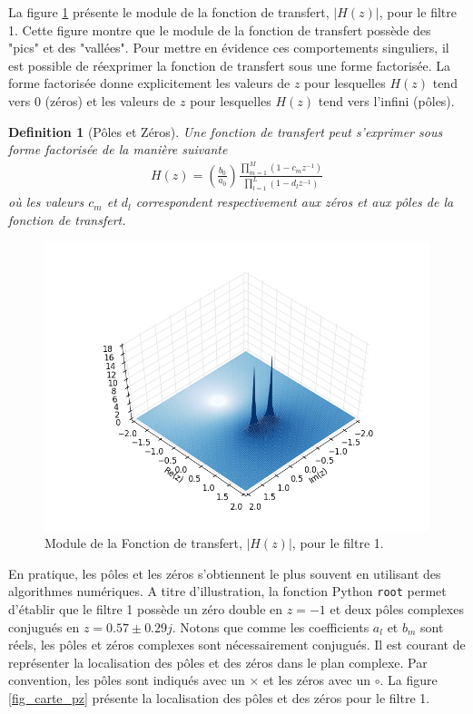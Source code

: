 \documentclass[11pt,a4paper]{IEEEtran}
\newtheorem{definition}{Definition}
\begin{document}
La figure \ref{fig_abs_z} présente le module de la fonction de transfert, $|H(z)|$, pour le filtre 1. Cette figure montre que le module de la fonction de transfert possède des "pics" et des "vallées". Pour mettre en évidence ces comportements singuliers, il est possible de réexprimer la fonction de transfert sous une forme factorisée. La forme factorisée donne explicitement les valeurs de $z$ pour lesquelles $H(z)$ tend vers $0$ (zéros) et les valeurs de $z$ pour lesquelles $H(z)$ tend vers l'infini (pôles). 

\begin{definition}[Pôles et Zéros] Une fonction de transfert peut s'exprimer sous forme factorisée de la manière suivante
\begin{align*}
H(z)=\left(\frac{b_0}{a_0}\right)\frac{\prod_{m=1}^{M}(1-c_m z^{-1})}{\prod_{l=1}^{L}(1-d_l z^{-1})}
\end{align*}
où les valeurs $c_m$ et $d_l$ correspondent respectivement aux zéros et aux pôles de la fonction de transfert.
\end{definition}

\begin{figure}[!t]
\centering
\includegraphics[width=1.1\linewidth]{./fig/z_plane_0.png}
\caption{Module de la Fonction de transfert, $|H(z)|$, pour le filtre 1.}
\label{fig_abs_z}
\end{figure}

En pratique, les pôles et les zéros s'obtiennent le plus souvent en utilisant des algorithmes numériques. A titre d'illustration, la fonction Python \texttt{root} permet d'établir que le filtre 1 possède un zéro double en $z=-1$ et deux pôles complexes conjugués en $z=0.57\pm 0.29j$. Notons que comme les coefficients $a_l$ et $b_m$ sont réels, les pôles et zéros complexes sont nécessairement conjugués. Il est courant de représenter la localisation des pôles et des zéros dans le plan complexe. Par convention, les pôles sont indiqués avec un $\times$ et les zéros avec un $\circ$. La figure \ref{fig_carte_pz} présente la localisation des pôles et des zéros pour le filtre 1.
\end{document}
